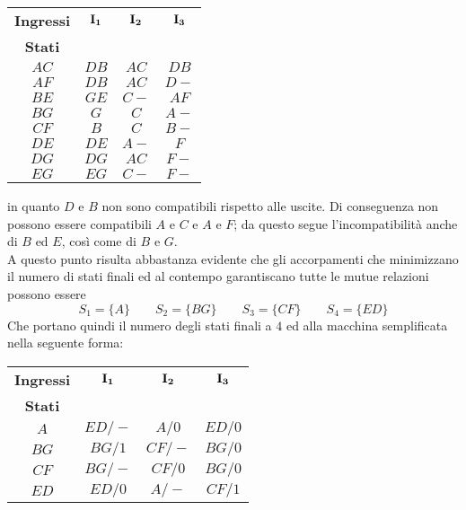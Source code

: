 \documentclass[a4paper]{extarticle}
\renewcommand\arraystretch{}
\begin{document}
\vspace{1em}
\noindent
\begin{table}[H]
\setlength{\tabcolsep}{4pt}
\renewcommand{\arraystretch}{1.2}
\centering
\begin{tabular}{c|c|c|c}
    \textbf{Ingressi} & $\bf{I_1}$ & $\bf{I_2}$ & $\bf{I_3}$\\
    \textbf{Stati}    &            &            &\\
    \hline
    \cellcolor{orange!25} $AC$ & \cellcolor{orange!25} $DB$ & \cellcolor{orange!25} $AC$ & \cellcolor{orange!25} $DB$\\
    \cellcolor{orange!25} $AF$ & \cellcolor{orange!25} $DB$ & \cellcolor{orange!25} $AC$ & \cellcolor{orange!25} $D-$\\
    \cellcolor{orange!25} $BE$ & \cellcolor{orange!25} $GE$ & \cellcolor{orange!25} $C-$ & \cellcolor{orange!25} $AF$\\
    $BG$ & $G$  & $C$  & $A-$\\
    $CF$ & $B$  & $C$  & $B-$\\
    $DE$ & $DE$ & $A-$ & $F$\\
    \cellcolor{orange!25}$DG$ & \cellcolor{orange!25} $DG$ & \cellcolor{orange!25} $AC$ & \cellcolor{orange!25} $F-$\\
    $EG$ & $EG$ & $C-$ & $F-$\\
\end{tabular}
\end{table}

\vspace{1em}
\noindent
in quanto $D$ e $B$ non sono compatibili rispetto alle uscite. Di conseguenza non possono essere compatibili $A$ e $C$ e $A$ e $F$; da questo segue l'incompatibilità anche di $B$ ed $E$, così come di $B$ e $G$.\\
A questo punto risulta abbastanza evidente che gli accorpamenti che minimizzano il numero di stati finali ed al contempo garantiscano tutte le mutue relazioni possono essere
\[S_1 = \{A\} \hspace{2em} S_2 = \{BG\} \hspace{2em} S_3 = \{CF\} \hspace{2em} S_4 = \{ED\}\]
Che portano quindi il numero degli stati finali a $4$ ed alla macchina semplificata nella seguente forma:

\vspace{1em}
\noindent
\begin{table}[H]
\setlength{\tabcolsep}{4pt}
\renewcommand{\arraystretch}{1.2}
\centering
\begin{tabular}{c|c|c|c}
    \textbf{Ingressi} & $\bf{I_1}$ & $\bf{I_2}$ & $\bf{I_3}$\\
    \textbf{Stati}    &            &            &\\
    \hline
    $A$  & $ED/-$ & $A/0$  & $ED/0$\\
    $BG$ & $BG/1$ & $CF/-$ & $BG/0$\\
    $CF$ & $BG/-$ & $CF/0$ & $BG/0$\\
    $ED$ & $ED/0$ & $A/-$  & $CF/1$\\
\end{tabular}
\end{table}
\end{document}
